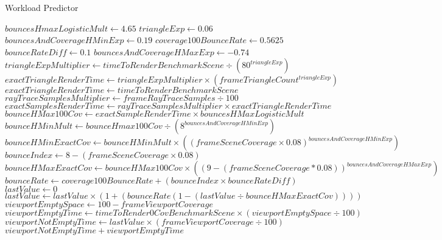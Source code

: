 ﻿\documentclass[a4paper]{article}
\begin{document}
    \begin{algorithm}
        \caption{Workload Predictor}\label{alg:cap}
        \begin{algorithmic}[1]
            \State
            \State $bouncesHmaxLogisticMult \gets 4.65$
            \State $triangleExp \gets 0.06$
            \State $bouncesAndCoverageHMinExp \gets 0.19$
            \State $coverage100BounceRate \gets 0.5625$
            \State $bounceRateDiff \gets 0.1$
            \State $bouncesAndCoverageHMaxExp \gets -0.74$
            \State
                \State $triangleExpMultiplier \gets timeToRenderBenchmarkScene \div (80 ^ {triangleExp})$
                \State $exactTriangleRenderTime \gets triangleExpMultiplier \times (frameTriangleCount ^ {triangleExp})$
            \Else
                \State $exactTriangleRenderTime \gets timeToRenderBenchmarkScene$
            \EndIf
            \State
            \State $rayTraceSamplesMultiplier \gets frameRayTraceSamples \div 100$
            \State $exactSamplesRenderTime \gets rayTraceSamplesMultiplier \times exactTriangleRenderTime$
            \State
            \State $bounceHMax100Cov \gets exactSampleRenderTime \times bouncesHMaxLogisticMult$
            \State $bounceHMinMult \gets bounceHmax100Cov \div (8 ^ {bouncesAndCoverageHMinExp})$
            \State $bounceHMinExactCov \gets bounceHMinMult \times ((frameSceneCoverage \times 0.08) ^ {bouncesAndCoverageHMinExp})$
            \State $bounceIndex \gets 8 - (frameSceneCoverage \times 0.08)$
            \State $bounceHMaxExactCov \gets bounceHMax100Cov \times ((9 - (frameSceneCoverage * 0.08)) ^ {bouncesAndCoverageHMaxExp})$
            \State $bounceRate \gets coverage100BounceRate + (bounceIndex \times bounceRateDiff)$
            \State
            \State $lastValue \gets 0$
                \State $lastValue \gets lastValue \times (1 + (bounceRate (1 - (lastValue \div bounceHMaxExactCov))))$
            \EndFor
            \State
            \State $viewportEmptySpace \gets 100 - frameViewportCoverage$
            \State $viewportEmptyTime \gets timeToRender0CovBenchmarkScene \times (viewportEmptySpace \div 100)$
            \State $viewportNotEmptyTime \gets lastValue \times (frameViewportCoverage \div 100)$
            \State\Return $viewportNotEmptyTime + viewportEmptyTime$
        \end{algorithmic}
    \end{algorithm}
\end{document}
